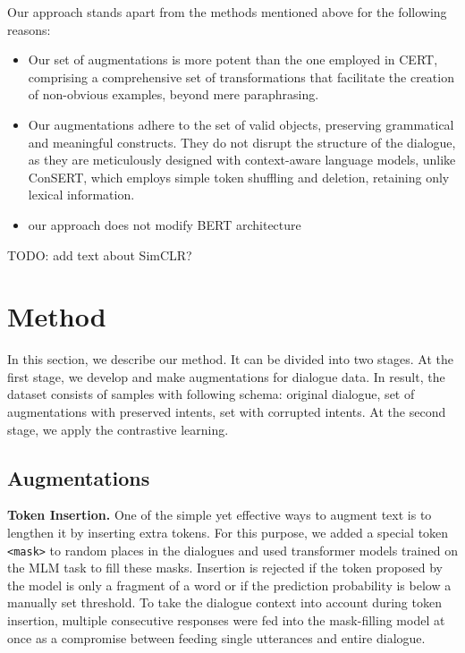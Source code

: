 \documentclass{article}
\begin{document}
Our approach stands apart from the methods mentioned above for the following reasons:
\begin{itemize}
    \item Our set of augmentations is more potent than the one employed in CERT, comprising a comprehensive set of transformations that facilitate the creation of non-obvious examples, beyond mere paraphrasing.
    \item Our augmentations adhere to the set of valid objects, preserving grammatical and meaningful constructs. They do not disrupt the structure of the dialogue, as they are meticulously designed with context-aware language models, unlike ConSERT, which employs simple token shuffling and deletion, retaining only lexical information.
    \item our approach does not modify BERT architecture
\end{itemize}

TODO: add text about SimCLR?

\section{Method}

In this section, we describe our method. It can be divided into two stages. At the first stage, we develop and make augmentations for dialogue data. In result, the dataset consists of samples with following schema: original dialogue, set of augmentations with preserved intents, set with corrupted intents. At the second stage, we apply the contrastive learning.

\subsection{Augmentations} \label{sec:aug}

\textbf{Token Insertion.} One of the simple yet effective ways to augment text is to lengthen it by inserting extra tokens. For this purpose, we added a special token \texttt{<mask>} to random places in the dialogues and used transformer models trained on the MLM task \cite{devlin2019bert} to fill these masks. Insertion is rejected if the token proposed by the model is only a fragment of a word \cite{wu2016googles, sennrich-etal-2016-neural} or if the prediction probability is below a manually set threshold. To take the dialogue context into account during token insertion, multiple consecutive responses were fed into the mask-filling model at once as a compromise between feeding single utterances and entire dialogue.
\end{document}
